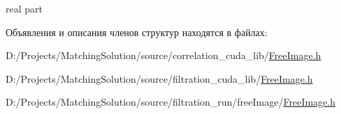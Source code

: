 real part 



Объявления и описания членов структур находятся в файлах:\begin{CompactItemize}
\item 
D:/Projects/MatchingSolution/source/correlation\_\-cuda\_\-lib/\hyperlink{correlation__cuda__lib_2_free_image_8h}{FreeImage.h}\item 
D:/Projects/MatchingSolution/source/filtration\_\-cuda\_\-lib/\hyperlink{filtration__cuda__lib_2_free_image_8h}{FreeImage.h}\item 
D:/Projects/MatchingSolution/source/filtration\_\-run/freeImage/\hyperlink{filtration__run_2free_image_2_free_image_8h}{FreeImage.h}\end{CompactItemize}
